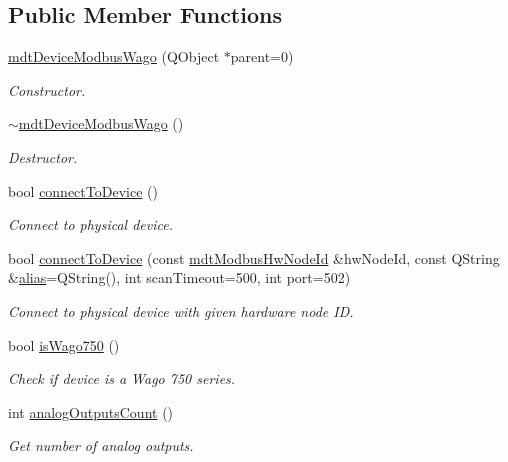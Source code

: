 \subsection*{Public Member Functions}
\begin{DoxyCompactItemize}
\item 
\hyperlink{classmdt_device_modbus_wago_a31abb03678a8afe2e6bf7c03e5e92726}{mdt\-Device\-Modbus\-Wago} (Q\-Object $\ast$parent=0)
\begin{DoxyCompactList}\small\item\em Constructor. \end{DoxyCompactList}\item 
\hyperlink{classmdt_device_modbus_wago_a8a13bfe3028d8c286d4233ea0ce0b2a8}{$\sim$mdt\-Device\-Modbus\-Wago} ()
\begin{DoxyCompactList}\small\item\em Destructor. \end{DoxyCompactList}\item 
bool \hyperlink{classmdt_device_modbus_wago_a5831a91162736cc01f35e7dd2c01852a}{connect\-To\-Device} ()
\begin{DoxyCompactList}\small\item\em Connect to physical device. \end{DoxyCompactList}\item 
bool \hyperlink{classmdt_device_modbus_wago_a5a0a92aa5334b4926f693344928a9d38}{connect\-To\-Device} (const \hyperlink{classmdt_modbus_hw_node_id}{mdt\-Modbus\-Hw\-Node\-Id} \&hw\-Node\-Id, const Q\-String \&\hyperlink{classmdt_device_a3aa589ecae0fa3deed61431d07db9276}{alias}=Q\-String(), int scan\-Timeout=500, int port=502)
\begin{DoxyCompactList}\small\item\em Connect to physical device with given hardware node I\-D. \end{DoxyCompactList}\item 
bool \hyperlink{classmdt_device_modbus_wago_a6f01ba89d90ddfbcaa0cbda1885d22f1}{is\-Wago750} ()
\begin{DoxyCompactList}\small\item\em Check if device is a Wago 750 series. \end{DoxyCompactList}\item 
int \hyperlink{classmdt_device_modbus_wago_ad812b7ee3a2f2677cddde205da5ec787}{analog\-Outputs\-Count} ()
\begin{DoxyCompactList}\small\item\em Get number of analog outputs. \end{DoxyCompactList}\item 

\end{DoxyCompactItemize}
